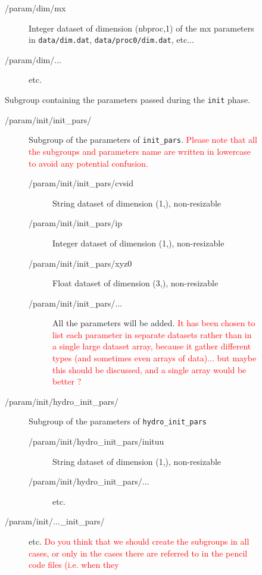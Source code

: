 \documentclass[a4paper,12pt]{article}
\newcommand{\note}[1]{\textcolor{red}{#1}}
\begin{document}
\begin{figure}[p]
{\begin{description}
\begin{description}
\begin{description}
\begin{description}
      \item[/param/dim/mx] Integer dataset of dimension (nbproc,1) of
        the mx parameters in \texttt{data/dim.dat},
        \texttt{data/proc0/dim.dat}, etc... 
      \item[/param/dim/...] etc.
      \end{description}
    \item[/param/init/] Subgroup containing the parameters
      passed during the \texttt{init} phase.
      \begin{description}
      \item[/param/init/init\_pars/]
        Subgroup of the parameters of
        \texttt{init\_pars}. \note{Please note that all the subgroups
          and parameters name are written in lowercase to avoid any
          potential confusion.}
        \begin{description}
          \item[/param/init/init\_pars/cvsid] String dataset of
            dimension (1,), non-resizable
          \item[/param/init/init\_pars/ip] Integer dataset of
            dimension (1,), non-resizable
          \item[/param/init/init\_pars/xyz0] Float dataset of
            dimension (3,), non-resizable
          \item[/param/init/init\_pars/...] All the parameters will be
            added. \note{It has been chosen to list each parameter in
            separate datasets rather than in a single large dataset
            array, because it gather different types (and sometimes
            even arrays of data)... but maybe this should be discussed,
            and a single array would be better ?}
        \end{description}
      \item[/param/init/hydro\_init\_pars/] Subgroup of the parameters
        of \texttt{hydro\_init\_pars}
        \begin{description}
        \item[/param/init/hydro\_init\_pars/inituu] String dataset of
            dimension (1,), non-resizable
        \item[/param/init/hydro\_init\_pars/...] etc.
        \end{description}
      \item[/param/init/...\_init\_pars/] etc. \note{Do you think that we
        should create the subgroups in all cases, or only in the cases
        there are referred to in the pencil code files (i.e. when they
}
\end{description}
\end{description}
\end{description}
\end{description}}
\end{figure}
\end{document}
